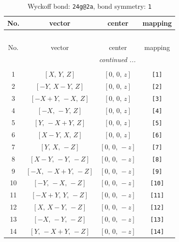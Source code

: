 \documentclass[fleqn,8pt]{jsarticle}
\begin{document}
\begin{longtable}{cccc}
\caption{Wyckoff bond: {\tt 24g@2a}, bond symmetry: {\tt 1}}
 \\
 \hline \hline
No. & vector & center & mapping \\ \hline \endfirsthead

\multicolumn{3}{l}{\tablename\ \thetable{}} \\
 \hline \hline
No. & vector & center & mapping \\ \hline \endhead

 \hline \hline
\multicolumn{3}{r}{\footnotesize\it continued ...} \\ \endfoot

 \hline \hline
\multicolumn{3}{r}{} \\ \endlastfoot

1 & $\left[ X,\, Y,\, Z \right]$ & $\left[ 0,\, 0,\, z \right]$ & {\tt [1]} \\ \hline
2 & $\left[ - Y,\, X - Y,\, Z \right]$ & $\left[ 0,\, 0,\, z \right]$ & {\tt [2]} \\ \hline
3 & $\left[ - X + Y,\, - X,\, Z \right]$ & $\left[ 0,\, 0,\, z \right]$ & {\tt [3]} \\ \hline
4 & $\left[ - X,\, - Y,\, Z \right]$ & $\left[ 0,\, 0,\, z \right]$ & {\tt [4]} \\ \hline
5 & $\left[ Y,\, - X + Y,\, Z \right]$ & $\left[ 0,\, 0,\, z \right]$ & {\tt [5]} \\ \hline
6 & $\left[ X - Y,\, X,\, Z \right]$ & $\left[ 0,\, 0,\, z \right]$ & {\tt [6]} \\ \hline
7 & $\left[ Y,\, X,\, - Z \right]$ & $\left[ 0,\, 0,\, - z \right]$ & {\tt [7]} \\ \hline
8 & $\left[ X - Y,\, - Y,\, - Z \right]$ & $\left[ 0,\, 0,\, - z \right]$ & {\tt [8]} \\ \hline
9 & $\left[ - X,\, - X + Y,\, - Z \right]$ & $\left[ 0,\, 0,\, - z \right]$ & {\tt [9]} \\ \hline
10 & $\left[ - Y,\, - X,\, - Z \right]$ & $\left[ 0,\, 0,\, - z \right]$ & {\tt [10]} \\ \hline
11 & $\left[ - X + Y,\, Y,\, - Z \right]$ & $\left[ 0,\, 0,\, - z \right]$ & {\tt [11]} \\ \hline
12 & $\left[ X,\, X - Y,\, - Z \right]$ & $\left[ 0,\, 0,\, - z \right]$ & {\tt [12]} \\ \hline
13 & $\left[ - X,\, - Y,\, - Z \right]$ & $\left[ 0,\, 0,\, - z \right]$ & {\tt [13]} \\ \hline
14 & $\left[ Y,\, - X + Y,\, - Z \right]$ & $\left[ 0,\, 0,\, - z \right]$ & {\tt [14]} \\ \hline

\end{longtable}
\end{document}
